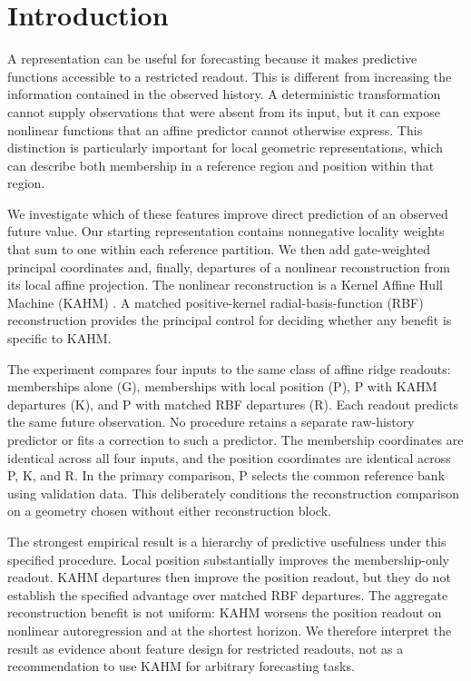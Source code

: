 
\section{Introduction}\label{sec:introduction}
A representation can be useful for forecasting because it makes predictive functions accessible to a restricted readout. This is different from increasing the information contained in the observed history. A deterministic transformation cannot supply observations that were absent from its input, but it can expose nonlinear functions that an affine predictor cannot otherwise express. This distinction is particularly important for local geometric representations, which can describe both membership in a reference region and position within that region.

We investigate which of these features improve direct prediction of an observed future value. Our starting representation contains nonnegative locality weights that sum to one within each reference partition. We then add gate-weighted principal coordinates and, finally, departures of a nonlinear reconstruction from its local affine projection. The nonlinear reconstruction is a Kernel Affine Hull Machine (KAHM) \citep{Kumar2024KAHM}. A matched positive-kernel radial-basis-function (RBF) reconstruction provides the principal control for deciding whether any benefit is specific to KAHM.

The experiment compares four inputs to the same class of affine ridge readouts: memberships alone (G), memberships with local position (P), P with KAHM departures (K), and P with matched RBF departures (R). Each readout predicts the same future observation. No procedure retains a separate raw-history predictor or fits a correction to such a predictor. The membership coordinates are identical across all four inputs, and the position coordinates are identical across P, K, and R. In the primary comparison, P selects the common reference bank using validation data. This deliberately conditions the reconstruction comparison on a geometry chosen without either reconstruction block.

The strongest empirical result is a hierarchy of predictive usefulness under this specified procedure. Local position substantially improves the membership-only readout. KAHM departures then improve the position readout, but they do not establish the specified advantage over matched RBF departures. The aggregate reconstruction benefit is not uniform: KAHM worsens the position readout on nonlinear autoregression and at the shortest horizon. We therefore interpret the result as evidence about feature design for restricted readouts, not as a recommendation to use KAHM for arbitrary forecasting tasks.

